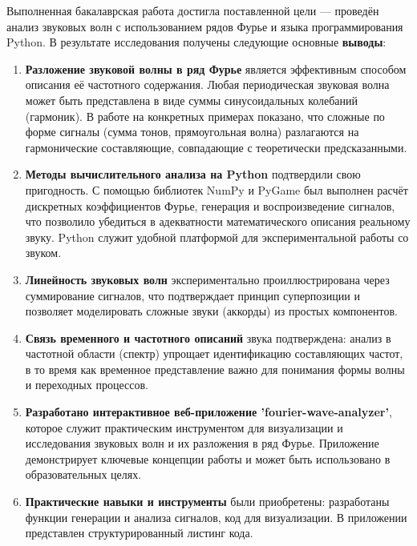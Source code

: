 \documentclass[bachelor, och, diploma]{SCWorks}
\begin{document}
\conclusion

Выполненная бакалаврская работа достигла поставленной цели --- проведён анализ звуковых волн с использованием рядов Фурье и языка программирования Python. В результате исследования получены следующие основные \textbf{выводы}:
\begin{enumerate}
  \item \textbf{Разложение звуковой волны в ряд Фурье} является эффективным способом описания её частотного содержания. Любая периодическая звуковая волна может быть представлена в виде суммы синусоидальных колебаний (гармоник). В работе на конкретных примерах показано, что сложные по форме сигналы (сумма тонов, прямоугольная волна) разлагаются на гармонические составляющие, совпадающие с теоретически предсказанными.
  \item \textbf{Методы вычислительного анализа на Python} подтвердили свою пригодность. С помощью библиотек NumPy и PyGame был выполнен расчёт дискретных коэффициентов Фурье, генерация и воспроизведение сигналов, что позволило убедиться в адекватности математического описания реальному звуку. Python служит удобной платформой для экспериментальной работы со звуком.
  \item \textbf{Линейность звуковых волн} экспериментально проиллюстрирована через суммирование сигналов, что подтверждает принцип суперпозиции и позволяет моделировать сложные звуки (аккорды) из простых компонентов.
  \item \textbf{Связь временного и частотного описаний} звука подтверждена: анализ в частотной области (спектр) упрощает идентификацию составляющих частот, в то время как временное представление важно для понимания формы волны и переходных процессов.
  \item \textbf{Разработано интерактивное веб-приложение 'fourier-wave-analyzer'}, которое служит практическим инструментом для визуализации и исследования звуковых волн и их разложения в ряд Фурье. Приложение демонстрирует ключевые концепции работы и может быть использовано в образовательных целях.
  \item \textbf{Практические навыки и инструменты} были приобретены: разработаны функции генерации и анализа сигналов, код для визуализации. В приложении представлен структурированный листинг кода.
\end{enumerate}

\end{document}
